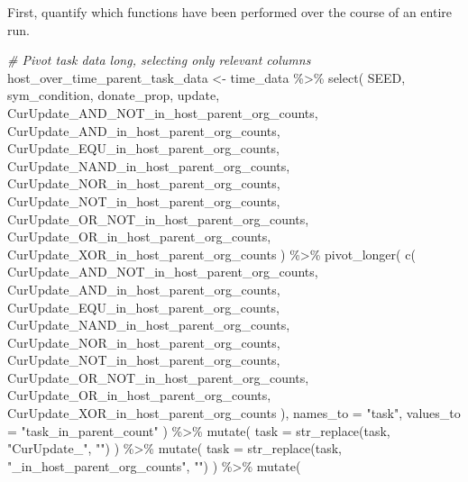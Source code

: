\documentclass[
]{book}
\newenvironment{Shaded}{\begin{snugshade}}{\end{snugshade}}
\newcommand{\AttributeTok}[1]{\textcolor[rgb]{0.77,0.63,0.00}{#1}}
\newcommand{\CommentTok}[1]{\textcolor[rgb]{0.56,0.35,0.01}{\textit{#1}}}
\newcommand{\FunctionTok}[1]{\textcolor[rgb]{0.00,0.00,0.00}{#1}}
\newcommand{\NormalTok}[1]{#1}
\newcommand{\OtherTok}[1]{\textcolor[rgb]{0.56,0.35,0.01}{#1}}
\newcommand{\SpecialCharTok}[1]{\textcolor[rgb]{0.00,0.00,0.00}{#1}}
\newcommand{\StringTok}[1]{\textcolor[rgb]{0.31,0.60,0.02}{#1}}
\begin{document}
First, quantify which functions have been performed over the course of an entire run.

\begin{Shaded}
\begin{Highlighting}[]
\CommentTok{\# Pivot task data long, selecting only relevant columns}
\NormalTok{host\_over\_time\_parent\_task\_data }\OtherTok{\textless{}{-}}\NormalTok{ time\_data }\SpecialCharTok{\%\textgreater{}\%}
  \FunctionTok{select}\NormalTok{(}
\NormalTok{    SEED,}
\NormalTok{    sym\_condition,}
\NormalTok{    donate\_prop,}
\NormalTok{    update,}
\NormalTok{    CurUpdate\_AND\_NOT\_in\_host\_parent\_org\_counts,}
\NormalTok{    CurUpdate\_AND\_in\_host\_parent\_org\_counts,}
\NormalTok{    CurUpdate\_EQU\_in\_host\_parent\_org\_counts,}
\NormalTok{    CurUpdate\_NAND\_in\_host\_parent\_org\_counts,}
\NormalTok{    CurUpdate\_NOR\_in\_host\_parent\_org\_counts,}
\NormalTok{    CurUpdate\_NOT\_in\_host\_parent\_org\_counts,}
\NormalTok{    CurUpdate\_OR\_NOT\_in\_host\_parent\_org\_counts,}
\NormalTok{    CurUpdate\_OR\_in\_host\_parent\_org\_counts,}
\NormalTok{    CurUpdate\_XOR\_in\_host\_parent\_org\_counts}
\NormalTok{  ) }\SpecialCharTok{\%\textgreater{}\%}
  \FunctionTok{pivot\_longer}\NormalTok{(}
    \FunctionTok{c}\NormalTok{(}
\NormalTok{      CurUpdate\_AND\_NOT\_in\_host\_parent\_org\_counts,}
\NormalTok{      CurUpdate\_AND\_in\_host\_parent\_org\_counts,}
\NormalTok{      CurUpdate\_EQU\_in\_host\_parent\_org\_counts,}
\NormalTok{      CurUpdate\_NAND\_in\_host\_parent\_org\_counts,}
\NormalTok{      CurUpdate\_NOR\_in\_host\_parent\_org\_counts,}
\NormalTok{      CurUpdate\_NOT\_in\_host\_parent\_org\_counts,}
\NormalTok{      CurUpdate\_OR\_NOT\_in\_host\_parent\_org\_counts,}
\NormalTok{      CurUpdate\_OR\_in\_host\_parent\_org\_counts,}
\NormalTok{      CurUpdate\_XOR\_in\_host\_parent\_org\_counts}
\NormalTok{    ),}
    \AttributeTok{names\_to =} \StringTok{"task"}\NormalTok{,}
    \AttributeTok{values\_to =} \StringTok{"task\_in\_parent\_count"}
\NormalTok{  ) }\SpecialCharTok{\%\textgreater{}\%}
  \FunctionTok{mutate}\NormalTok{(}
    \AttributeTok{task =} \FunctionTok{str\_replace}\NormalTok{(task, }\StringTok{"CurUpdate\_"}\NormalTok{, }\StringTok{""}\NormalTok{)}
\NormalTok{  ) }\SpecialCharTok{\%\textgreater{}\%}
  \FunctionTok{mutate}\NormalTok{(}
    \AttributeTok{task =} \FunctionTok{str\_replace}\NormalTok{(task, }\StringTok{"\_in\_host\_parent\_org\_counts"}\NormalTok{, }\StringTok{""}\NormalTok{)}
\NormalTok{  ) }\SpecialCharTok{\%\textgreater{}\%}
  \FunctionTok{mutate}\NormalTok{(}

\end{Highlighting}
\end{Shaded}
\end{document}
